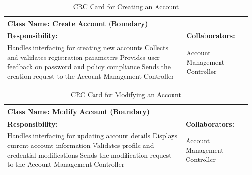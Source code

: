 \documentclass[]{article}
\begin{document}
\begin{table}[H]
    \centering
    \caption{CRC Card for Creating an Account}
    \vspace{1mm}
    \begin{tabular}{|p{7.5cm}|p{7.5cm}|}
    \hline 
    \multicolumn{2}{|l|}{\textbf{Class Name: Create Account (Boundary)}} \\
    \hline
    \textbf{Responsibility:} & \textbf{Collaborators:} \\
    \hline
        Handles interfacing for creating new accounts \newline
        Collects and validates registration parameters \newline
        Provides user feedback on password and policy compliance \newline
        Sends the creation request to the Account Management Controller \newline
        &
        Account Management Controller \\
    \hline
    \end{tabular}
\end{table}
\begin{table}[H]
    \centering
    \caption{CRC Card for Modifying an Account}
    \vspace{1mm}
    \begin{tabular}{|p{7.5cm}|p{7.5cm}|}
    \hline 
    \multicolumn{2}{|l|}{\textbf{Class Name: Modify Account (Boundary)}} \\
    \hline
    \textbf{Responsibility:} & \textbf{Collaborators:} \\
    \hline
        Handles interfacing for updating account details \newline
        Displays current account information \newline
        Validates profile and credential modifications \newline
        Sends the modification request to the Account Management Controller \newline
        &
        Account Management Controller \\
    \hline
    \end{tabular}
\end{table}
\end{document}
